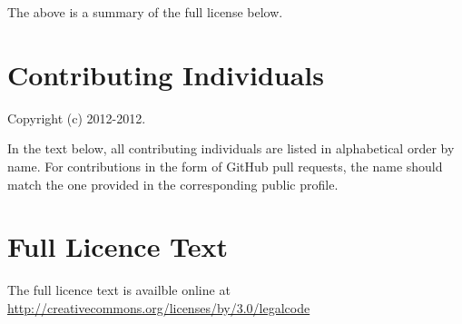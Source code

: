 \documentclass[a4paper,10pt,twoside]{book}
\begin{document}
\noindent The above is a summary of the full license below.

\newpage
\section{Contributing Individuals}

Copyright (c) 2012-2012.

\noindent In the text below, all contributing individuals are listed in alphabetical order by name. 
For contributions in the form of GitHub pull requests, the name should match the one provided in the corresponding public profile.

\noindent


\section{Full Licence Text}

The full licence text is availble online at 
\url{http://creativecommons.org/licenses/by/3.0/legalcode}





\ifx\wholebook\relax\else
   
   
\end{document}
